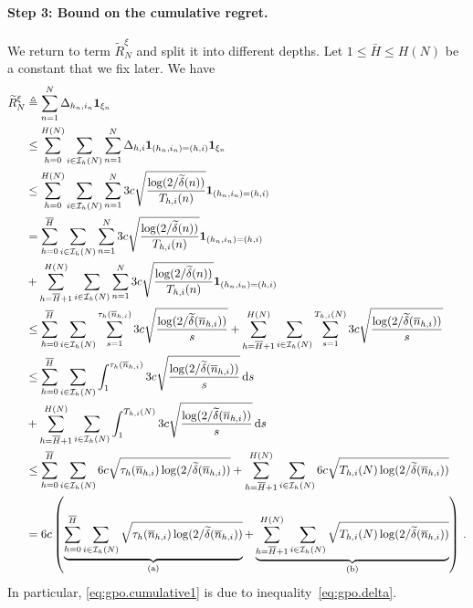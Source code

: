 \paragraph{Step 3: Bound on the cumulative regret.}
We return to  term $\tilde{R}_N^{\xi}$ and split it into different depths. Let $1\leq \bar{H} \leq H(N)$ be a constant that we  fix later. We have
\begingroup
\allowdisplaybreaks
\begin{align}
    \widetilde{R}_N^{\xi} &\triangleq \sum_{n=1}^N \Delta_{h_n,i_n} {\bf 1}_{\xi_n} \nonumber \\
                              &\leq \sum_{h=0}^{H(N)}\sum_{i\in\mathcal{I}_h(N)}\sum_{n=1}^N \Delta_{h,i} {\bf 1}_{(h_n,i_n)=(h,i)} {\bf 1}_{\xi_n} \nonumber \\
                              &\leq \sum_{h=0}^{H(N)}\sum_{i\in\mathcal{I}_h(N)}\sum_{n=1}^N 3c\sqrt{\frac{\log(2/\widetilde{\delta}(n))}{T_{h,i}(n)}} {\bf 1}_{(h_n,i_n)=(h,i)} \label{eq:gpo.cumulative1} \\
                              &= \sum_{h=0}^{\overline{H}}\sum_{i\in\mathcal{I}_h(N)}\sum_{n=1}^N 3c\sqrt{\frac{\log(2/\widetilde{\delta}(n))}{T_{h,i}(n)}} {\bf 1}_{(h_n,i_n)=(h,i)} \nonumber \\
                              &+ \sum_{h=\overline{H}+1}^{H(N)}\sum_{i\in\mathcal{I}_h(N)}\sum_{n=1}^N 3c\sqrt{\frac{\log(2/\widetilde{\delta}(n))}{T_{h,i}(n)}} {\bf 1}_{(h_n,i_n)=(h,i)} \nonumber \\
                              &\leq \sum_{h=0}^{\overline{H}}\sum_{i\in\mathcal{I}_h(N)}\sum_{s=1}^{\tau_h(\overline{n}_{h,i})} 3c\sqrt{\frac{\log(2/\widetilde{\delta}(\overline{n}_{h,i}))}{s}} + \sum_{h=\overline{H}+1}^{H(N)}\sum_{i\in\mathcal{I}_h(N)}\sum_{s=1}^{T_{h,i}(N)} 3c\sqrt{\frac{\log(2/\widetilde{\delta}(\overline{n}_{h,i}))}{s}} \nonumber \\
                              &\leq \sum_{h=0}^{\overline{H}}\sum_{i\in\mathcal{I}_h(N)}\int_{1}^{\tau_h(\overline{n}_{h,i})} 3c\sqrt{\frac{\log(2/\widetilde{\delta}(\overline{n}_{h,i}))}{s}} \, \mathrm{d}s \nonumber \\
                              &+ \sum_{h=\overline{H}+1}^{H(N)}\sum_{i\in\mathcal{I}_h(N)}\int_{1}^{T_{h,i}(N)} 3c\sqrt{\frac{\log(2/\widetilde{\delta}(\overline{n}_{h,i}))}{s}} \, \mathrm{d}s \nonumber \\
                              &\leq \sum_{h=0}^{\overline{H}}\sum_{i\in\mathcal{I}_h(N)} 6c\sqrt{\tau_h(\overline{n}_{h,i})\log(2/\widetilde{\delta}(\overline{n}_{h,i}))} + \sum_{h=\overline{H}+1}^{H(N)}\sum_{i\in\mathcal{I}_h(N)} 6c\sqrt{T_{h,i}(N)\log(2/\widetilde{\delta}(\overline{n}_{h,i}))} \nonumber \\
                              &= 6c\left(\underbrace{\sum_{h=0}^{\overline{H}}\sum_{i\in\mathcal{I}_h(N)} \sqrt{\tau_h(\overline{n}_{h,i})\log(2/\widetilde{\delta}(\overline{n}_{h,i}))}}_\text{(a)} + \underbrace{\sum_{h=\overline{H}+1}^{H(N)}\sum_{i\in\mathcal{I}_h(N)} \sqrt{T_{h,i}(N)\log(2/\widetilde{\delta}(\overline{n}_{h,i}))}}_\text{(b)}\right) \nonumber \,.
\end{align}
\endgroup
In particular, \eqref{eq:gpo.cumulative1} is due to inequality~\eqref{eq:gpo.delta}.

